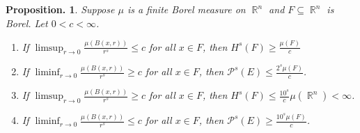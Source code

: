 \documentclass[11pt, a4paper]{memoir}
\DeclareMathOperator{\R}{{\mathbb{R}}}
\theoremstyle{change}
\newtheorem{proposition}[theorem]{Proposition.}
\theoremstyle{plain}
\theoremstyle{nonumberplain}
\numberwithin{equation}{section}
\begin{document}
\begin{proposition}
    Suppose $\mu$ is a finite Borel measure on $\R^n$ and $F\subseteq\R^n$ is Borel.
    Let $0<c<\infty$.
    \begin{enumerate}[nl,r]
        \item If $\limsup_{r\to 0}\frac{\mu(B(x,r))}{r^s}\leq c$ for all $x\in F$, then $H^s(F)\geq\frac{\mu(F)}{c}$
        \item If $\liminf_{r\to 0}\frac{\mu(B(x,r))}{r^s}\geq c$ for all $x\in F$, then $\mathcal{P}^s(E)\leq\frac{2^s\mu(F)}{c}$.
        \item If $\limsup_{r\to 0}\frac{\mu(B(x,r))}{r^s}\geq c$ for all $x\in F$, then $H^s(F)\leq\frac{10^s}{c}\mu(\R^n)<\infty$.
        \item If $\liminf_{r\to 0}\frac{\mu(B(x,r))}{r^s}\leq c$ for all $x\in F$, then $\mathcal{P}^s(E)\geq\frac{10^s\mu(F)}{c}$.
    \end{enumerate}
\end{proposition}
\end{document}

